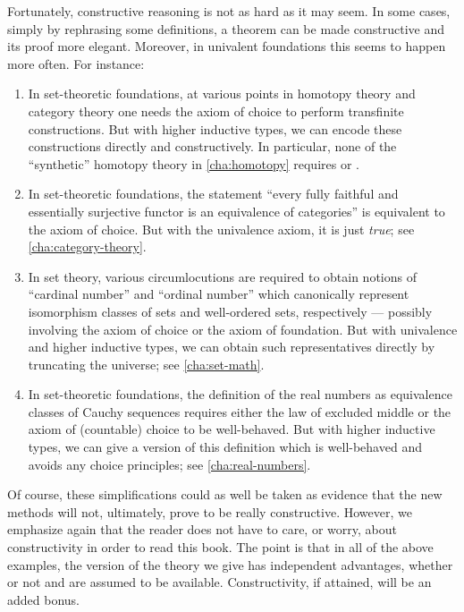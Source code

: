 Fortunately, constructive reasoning is not as hard as it may seem.
In some cases, simply by rephrasing some definitions, a theorem can be made constructive and its proof more elegant.
Moreover, in univalent foundations this seems to happen more often.
For instance:
\begin{enumerate}
\item In set-theoretic foundations, at various points in homotopy theory and category theory one needs the axiom of choice to perform transfinite constructions.
  But with higher inductive types, we can encode these constructions directly and constructively.
  In particular, none of the ``synthetic'' homotopy theory in \cref{cha:homotopy} requires \LEM{} or \choice{}.
\item In set-theoretic foundations, the statement ``every fully faithful and essentially surjective functor is an equivalence of categories'' is equiv\-a\-lent to the axiom of choice.
  But with the univalence axiom, it is just \emph{true}; see \cref{cha:category-theory}.
\item In set theory, various circumlocutions are required to obtain notions of ``cardinal number'' and ``ordinal number'' which canonically represent isomorphism classes of sets and well-ordered sets, respectively --- possibly involving the axiom of choice or the axiom of foundation.
  But with univalence and higher inductive types, we can obtain such representatives directly by truncating the universe; see \cref{cha:set-math}.
\item In set-theoretic foundations, the definition of the real numbers as equivalence classes of Cauchy sequences requires either the law of excluded middle or the axiom of (countable) choice to be well-behaved.
  But with higher inductive types, we can give a version of this definition which is well-behaved and avoids any choice principles; see \cref{cha:real-numbers}.
\end{enumerate}
Of course, these simplifications could as well be taken as evidence that the new methods will not, ultimately, prove to be really constructive.  However, we emphasize again that the reader does not have to care, or worry, about constructivity in order to read this book.  The point is that in all of the above examples, the version of the theory we give has independent advantages, whether or not \LEM{} and \choice{} are assumed to be available.  Constructivity, if attained, will be an added bonus.%

